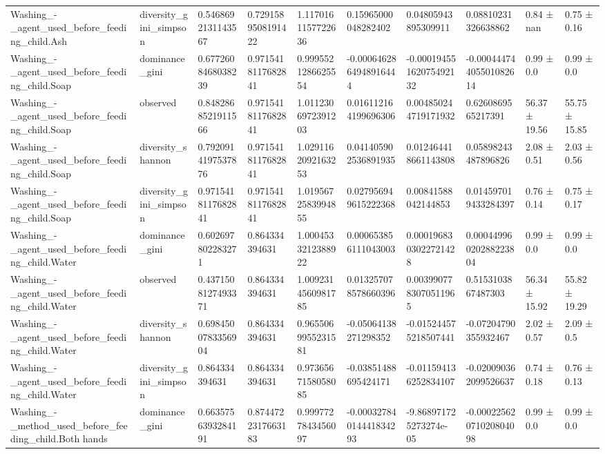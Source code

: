 \begin{longtable}{llllllllll}
Washing\_-\_agent\_used\_before\_feeding\_child.Ash & diversity\_gini\_simpson & 0.5468692131143567 & 0.7291589508191422 & 1.1170161157722636 & 0.15965000048282402 & 0.04805943895309911 & 0.08810231326638862 & 0.84 ± nan & 0.75 ± 0.16 \\
Washing\_-\_agent\_used\_before\_feeding\_child.Soap & dominance\_gini & 0.6772608468038239 & 0.9715418117682841 & 0.9995521286625554 & -0.0006462864948916444 & -0.00019455162075492132 & -0.00044474405501082614 & 0.99 ± 0.0 & 0.99 ± 0.0 \\
Washing\_-\_agent\_used\_before\_feeding\_child.Soap & observed & 0.8482868521911566 & 0.9715418117682841 & 1.0112306972391203 & 0.016112164199696306 & 0.004850244719171932 & 0.6260869565217391 & 56.37 ± 19.56 & 55.75 ± 15.85 \\
Washing\_-\_agent\_used\_before\_feeding\_child.Soap & diversity\_shannon & 0.7920914197537876 & 0.9715418117682841 & 1.0291162092163253 & 0.041405902536891935 & 0.012464418661143808 & 0.05898243487896826 & 2.08 ± 0.51 & 2.03 ± 0.56 \\
Washing\_-\_agent\_used\_before\_feeding\_child.Soap & diversity\_gini\_simpson & 0.9715418117682841 & 0.9715418117682841 & 1.0195672583994855 & 0.027956949615222368 & 0.00841588042144853 & 0.014597019433284397 & 0.76 ± 0.14 & 0.75 ± 0.17 \\
Washing\_-\_agent\_used\_before\_feeding\_child.Water & dominance\_gini & 0.602697802283271 & 0.864334394631 & 1.0004533212388922 & 0.000653856111043003 & 0.0001968303022721428 & 0.00044996020288223804 & 0.99 ± 0.0 & 0.99 ± 0.0 \\
Washing\_-\_agent\_used\_before\_feeding\_child.Water & observed & 0.4371508127493371 & 0.864334394631 & 1.0092314560981785 & 0.013257078578660396 & 0.0039907783070511965 & 0.5153103867487303 & 56.34 ± 15.92 & 55.82 ± 19.29 \\
Washing\_-\_agent\_used\_before\_feeding\_child.Water & diversity\_shannon & 0.6984500783356904 & 0.864334394631 & 0.9655069955231581 & -0.05064138271298352 & -0.015244575218507441 & -0.07204790355932467 & 2.02 ± 0.57 & 2.09 ± 0.5 \\
Washing\_-\_agent\_used\_before\_feeding\_child.Water & diversity\_gini\_simpson & 0.864334394631 & 0.864334394631 & 0.9736567158058085 & -0.03851488695424171 & -0.011594136252834107 & -0.020090362099526637 & 0.74 ± 0.18 & 0.76 ± 0.13 \\
Washing\_-\_method\_used\_before\_feeding\_child.Both hands & dominance\_gini & 0.6635756393284191 & 0.8744722317663183 & 0.9997727843456097 & -0.00032784014441834293 & -9.868971725273274e-05 & -0.00022562071020804098 & 0.99 ± 0.0 & 0.99 ± 0.0 \\

\end{longtable}
